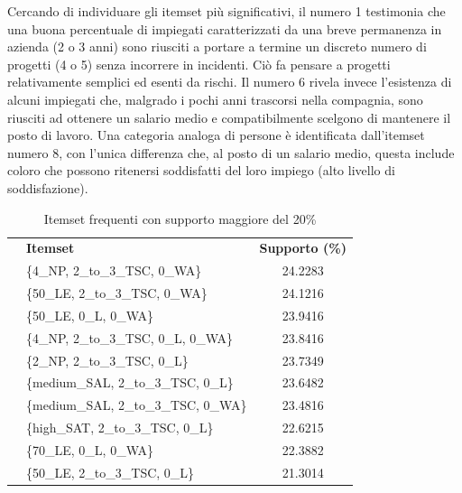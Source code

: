 \documentclass[a4paper]{article}
\newcounter{rowno}
\begin{document}
Cercando di individuare gli itemset più significativi, il numero 1 testimonia che una buona percentuale di impiegati caratterizzati da una breve permanenza in azienda (2 o 3 anni) sono riusciti a portare a termine un discreto numero di progetti (4 o 5) senza incorrere in incidenti. Ciò fa pensare a progetti relativamente semplici ed esenti da rischi. Il numero 6 rivela invece l'esistenza di alcuni impiegati che, malgrado i pochi anni trascorsi nella compagnia, sono riusciti ad ottenere un salario medio e compatibilmente scelgono di mantenere il posto di lavoro. Una categoria analoga di persone è identificata dall'itemset numero 8, con l'unica differenza che, al posto di un salario medio, questa include coloro che possono ritenersi soddisfatti del loro impiego (alto livello di soddisfazione). 

\begin{table}[h]
\centering
\begingroup
\setlength{\tabcolsep}{5pt} %
\renewcommand{\arraystretch}{1} %
\setcounter{rowno}{0}

\begin{tabularx}{\textwidth}{|>{\stepcounter{rowno}\therowno}c|X|c|}
\hline
\multicolumn{1}{r}{\#} & {\textbf{Itemset}} & {\textbf{Supporto (\%)}} \\

& \{4\_NP, 2\_to\_3\_TSC, 0\_WA\} & 24.2283 \\ 
& \{50\_LE, 2\_to\_3\_TSC, 0\_WA\} & 24.1216 \\ 
& \{50\_LE, 0\_L, 0\_WA\} & 23.9416 \\ 
& \{4\_NP, 2\_to\_3\_TSC, 0\_L, 0\_WA\} & 23.8416 \\ 
& \{2\_NP, 2\_to\_3\_TSC, 0\_L\} & 23.7349 \\ 
& \{medium\_SAL, 2\_to\_3\_TSC, 0\_L\} & 23.6482 \\ 
& \{medium\_SAL, 2\_to\_3\_TSC, 0\_WA\} & 23.4816 \\ 
& \{high\_SAT, 2\_to\_3\_TSC, 0\_L\} & 22.6215 \\ 
& \{70\_LE, 0\_L, 0\_WA\} & 22.3882 \\ 
& \{50\_LE, 2\_to\_3\_TSC, 0\_L\} & 21.3014 \\ 

\hline
\end{tabularx}
\endgroup
\caption{Itemset frequenti con supporto maggiore del 20\%}
\label{tab:frequent_sup_20_101}
\end{table}
\end{document}
